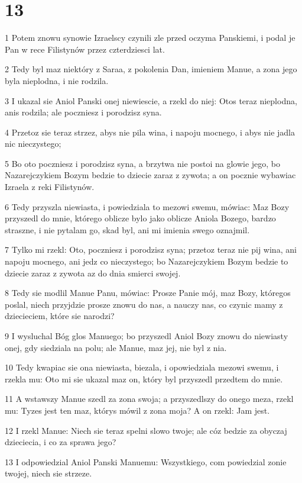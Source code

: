 \chapter{13}

\par 1 Potem znowu synowie Izraelscy czynili zle przed oczyma Panskiemi, i podal je Pan w rece Filistynów przez czterdziesci lat.
\par 2 Tedy byl maz niektóry z Saraa, z pokolenia Dan, imieniem Manue, a zona jego byla nieplodna, i nie rodzila.
\par 3 I ukazal sie Aniol Panski onej niewiescie, a rzekl do niej: Otos teraz nieplodna, anis rodzila; ale poczniesz i porodzisz syna.
\par 4 Przetoz sie teraz strzez, abys nie pila wina, i napoju mocnego, i abys nie jadla nic nieczystego;
\par 5 Bo oto poczniesz i porodzisz syna, a brzytwa nie postoi na glowie jego, bo Nazarejczykiem Bozym bedzie to dziecie zaraz z zywota; a on pocznie wybawiac Izraela z reki Filistynów.
\par 6 Tedy przyszla niewiasta, i powiedziala to mezowi swemu, mówiac: Maz Bozy przyszedl do mnie, którego oblicze bylo jako oblicze Aniola Bozego, bardzo straszne, i nie pytalam go, skad byl, ani mi imienia swego oznajmil.
\par 7 Tylko mi rzekl: Oto, poczniesz i porodzisz syna; przetoz teraz nie pij wina, ani napoju mocnego, ani jedz co nieczystego; bo Nazarejczykiem Bozym bedzie to dziecie zaraz z zywota az do dnia smierci swojej.
\par 8 Tedy sie modlil Manue Panu, mówiac: Prosze Panie mój, maz Bozy, któregos poslal, niech przyjdzie prosze znowu do nas, a nauczy nas, co czynic mamy z dziecieciem, które sie narodzi?
\par 9 I wysluchal Bóg glos Manuego; bo przyszedl Aniol Bozy znowu do niewiasty onej, gdy siedziala na polu; ale Manue, maz jej, nie byl z nia.
\par 10 Tedy kwapiac sie ona niewiasta, biezala, i opowiedziala mezowi swemu, i rzekla mu: Oto mi sie ukazal maz on, który byl przyszedl przedtem do mnie.
\par 11 A wstawszy Manue szedl za zona swoja; a przyszedlszy do onego meza, rzekl mu: Tyzes jest ten maz, którys mówil z zona moja? A on rzekl: Jam jest.
\par 12 I rzekl Manue: Niech sie teraz spelni slowo twoje; ale cóz bedzie za obyczaj dzieciecia, i co za sprawa jego?
\par 13 I odpowiedzial Aniol Panski Manuemu: Wszystkiego, com powiedzial zonie twojej, niech sie strzeze.
